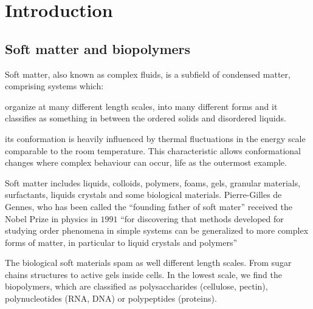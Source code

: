 
\chapter{Introduction} %

\label{Introduction} %



    
    

\section{Soft matter and biopolymers}
Soft matter, also known as complex fluids, is a subfield of condensed
matter, comprising systems which:
\begin{enumerate*}[label=\bfseries\alph*)]
 
\item organize at many different length scales, into
many different forms and it classifies as something in between the
ordered solids and disordered liquids.\
\item its conformation is heavily
influenced by thermal fluctuations in the energy scale comparable to the room
temperature. This characteristic allows conformational changes where complex
behaviour can occur, life as the outermost example.
\end{enumerate*}

Soft matter includes liquids, colloids, polymers, foams, gels, granular
materials, surfactants, liquids crystals and some biological materials.
Pierre-Gilles de Gennes, who has been called the ``founding father of soft
mater'' received the Nobel Prize in physics in $1991$ ``for discovering that 
methods developed for studying order phenomena in simple systems can be 
generalized to more complex forms of matter, in particular to liquid  crystals
and polymers''\citep{de_gennes_pierre-gilles_????}

The biological soft materials spam as well different length scales. From sugar
chains structures to active gels inside cells. In the
lowest scale, we find the biopolymers, which are classified as polysaccharides
(cellulose, pectin),  polynucleotides (RNA, DNA) or polypeptides (proteins).


